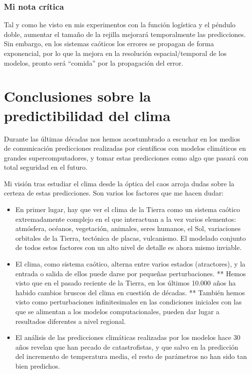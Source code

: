 \documentclass[
  11pt,
  a4paper,
  DIV=11,
  numbers=noendperiod]{scrreprt}
\providecommand{\tightlist}{%
  \setlength{\itemsep}{0pt}\setlength{\parskip}{0pt}}
\begin{document}
\subsection{Mi nota crítica}\label{mi-nota-cruxedtica}

Tal y como he visto en mis experimentos con la función logística y el
péndulo doble, aumentar el tamaño de la rejilla mejorará temporalmente
las predicciones. Sin embargo, en los sistemas caóticos los errores se
propagan de forma exponencial, por lo que la mejora en la resolución
espacial/temporal de los modelos, pronto será ``comida'' por la
propagación del error.

\chapter{Conclusiones sobre la predictibilidad del
clima}\label{conclusiones-sobre-la-predictibilidad-del-clima}

Durante las últimas décadas nos hemos acostumbrado a escuchar en los
medios de comunicación predicciones realizadas por científicos con
modelos climáticos en grandes supercomputadores, y tomar estas
predicciones como algo que pasará con total seguridad en el futuro.

Mi visión tras estudiar el clima desde la óptica del caos arroja dudas
sobre la certeza de estas predicciones. Son varios los factores que me
hacen dudar:

\begin{itemize}
\tightlist
\item
  En primer lugar, hay que ver el clima de la Tierra como un sistema
  caótico extremadamente complejo en el que interactuan a la vez varios
  elementos: atmósfera, océanos, vegetación, animales, seres humanos, el
  Sol, variaciones orbitales de la Tierra, tectónica de placas,
  vulcanismo. El modelado conjunto de todos estos factores con un alto
  nivel de detalle es ahora mismo inviable.
\item
  El clima, como sistema caótico, alterna entre varios estados
  (atractores), y la entrada o salida de ellos puede darse por pequeñas
  perturbaciones. ** Hemos visto que en el pasado reciente de la Tierra,
  en los últimos 10.000 años ha habido cambios bruscos del clima en
  cuestión de décadas. ** También hemos visto como perturbaciones
  infinitesimales en las condiciones iniciales con las que se alimentan
  a los modelos computacionales, pueden dar lugar a resultados
  diferentes a nivel regional.
\item
  El análisis de las predicciones climáticas realizadas por los modelos
  hace 30 años revelan que han pecado de catastrofistas, y que salvo en
  la predicción del incremento de temperatura media, el resto de
  parámetros no han sido tan bien predichos.
\end{itemize}
\end{document}

